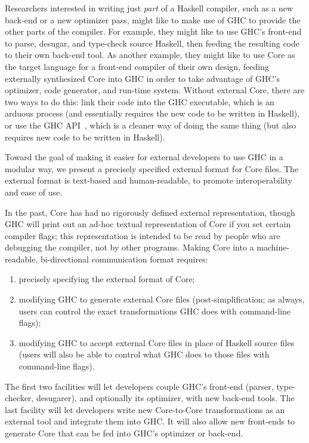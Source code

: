 \documentclass[10pt]{article}
\begin{document}
Researchers interested in writing just {\it part} of a Haskell compiler,
such as a new back-end or a new optimizer pass, might like to make
use of GHC to provide the other parts of the compiler.  For example, they
might like to use GHC's front-end to parse, desugar, and type-check source Haskell,
then feeding the resulting code to their own back-end tool. As another example, they might like to use Core as the target language for a front-end compiler of their own design, feeding externally synthesized Core into GHC in order to take advantage of GHC's optimizer, code generator, and run-time system. Without external Core, there are two ways to do this: link their code into the
GHC executable, which is an arduous process (and essentially requires
the new code to be written in Haskell), or use the GHC API~\citep{ghc-api}, which is a cleaner way of doing the same thing (but also requires new code to be written in Haskell). 

Toward the goal of making it easier for external developers to use GHC in a modular way, we present a precisely specified external format for Core files. The external format is text-based and human-readable, to promote interoperability and ease of use.

In the past, Core has had no rigorously defined external representation, though GHC will print out an ad-hoc textual representation of Core if you set certain compiler flags; this representation is intended to be read by people who are debugging the compiler, not by other programs. Making Core into a machine-readable, bi-directional communication format requires:

\begin{enumerate}
\item precisely specifying the external format of Core;

\item modifying GHC to generate external Core files (post-simplification; as always, users can control the exact transformations GHC does with command-line flags);

\item modifying GHC to accept external Core files in place of Haskell 
source files (users will also be able to control what GHC does to those files with command-line flags).

\end{enumerate}

The first two facilities will let developers couple GHC's front-end (parser,
type-checker, desugarer), and optionally its optimizer, with new back-end tools.
The last facility will let developers write new Core-to-Core 
transformations as an external tool and integrate them into GHC. It will also
allow new front-ends to generate Core that can be fed into GHC's optimizer or 
back-end.
\end{document}
